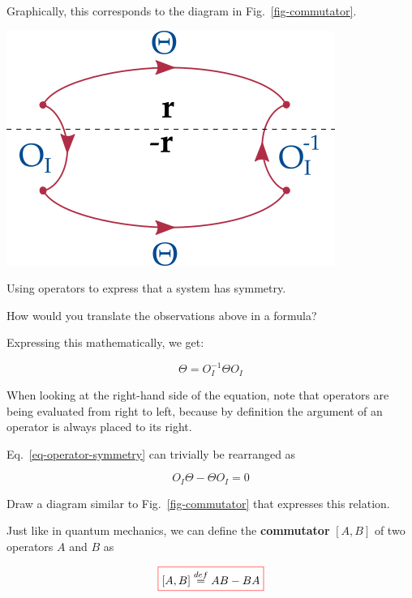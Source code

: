 Graphically, this corresponds to the diagram in Fig.~\ref{fig-commutator}.

\begin{marginfigure}[1.0cm]
 \includegraphics{symmetry/figures/commutator}
 \caption{Using operators to express that a system has symmetry.}
 \label{fig-commutator} 
\end{marginfigure}

\begin{cue}
How would you translate the observations above in a formula?
\end{cue}

Expressing this mathematically, we get:

\begin{equation}
  \Theta = O_I^{-1} \Theta O_I
  \label{eq-operator-symmetry}
\end{equation} 

When looking at the right-hand side of the equation, note that operators are being evaluated from right to left, because by definition the argument of an operator is always placed to its right.

Eq.~\ref{eq-operator-symmetry} can trivially be rearranged as

$$O_I \Theta - \Theta O_I = 0$$

\begin{exer}
Draw a diagram similar to Fig.~\ref{fig-commutator} that expresses this relation.
\end{exer}

Just like in quantum mechanics, we can define the \textbf{commutator} $[A,B]$ of two operators $A$ and $B$ as

\begin{equation}
 \fbox{$\displaystyle
   [A,B] \stackrel{def}{=} AB - BA
 $}
\end{equation} 

